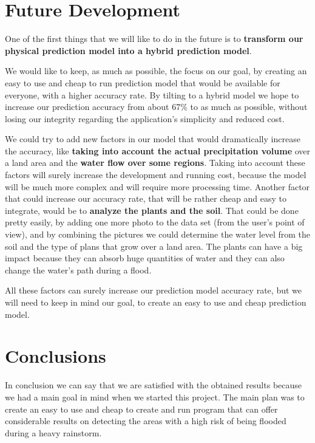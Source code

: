 \documentclass[12pt, a4paper]{report}
\begin{document}
\section{Future Development}

\quad
One of the first things that we will like to do in the future is to \textbf{transform our physical prediction model into a hybrid prediction model}.
\par 

We would like to keep, as much as possible, the focus on our goal, by creating an easy to use and cheap to run prediction model that would be available for everyone, with a higher accuracy rate. By tilting to a hybrid model we hope to increase our prediction accuracy from about 67\% to as much as possible, without losing our integrity regarding the application's simplicity and reduced cost.
\par

We could try to add new factors in our model that would dramatically increase the accuracy, like \textbf{taking into account the actual precipitation volume} over a land area and the \textbf{water flow over some regions}. Taking into account these factors will surely increase the development and running cost, because the model will be much more complex and will require more processing time. Another factor that could increase our accuracy rate, that will be rather cheap and easy to integrate, would be to \textbf{analyze the plants and the soil}. That could be done pretty easily, by adding one more photo to the data set (from the user's point of view), and by combining the pictures we could determine the water level from the soil and the type of plans that grow over a land area. The plants can have a big impact because they can absorb huge quantities of water and they can also change the water's path during a flood.
\par 
All these factors can surely increase our prediction model accuracy rate, but we will need to keep in mind our goal, to create an easy to use and cheap prediction model.

\newpage


\section{Conclusions}

\quad 
In conclusion we can say that we are satisfied with the obtained results because we had a main goal in mind when we started this project. The main plan was to create an easy to use and cheap to create and run program that can offer considerable results on detecting the areas with a high risk of being flooded during a heavy rainstorm.
\par 
\end{document}
